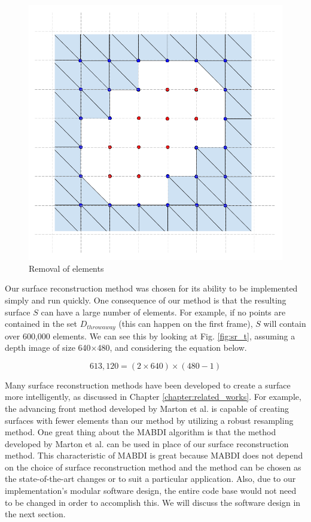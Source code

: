 \begin{figure}[h]%
\centering
  \includegraphics[width=.70\textwidth]
    {figures/diagram_sr_element_removal.png}
  \caption{Removal of elements}
  \label{fig:sr_em}
\end{figure}

Our surface reconstruction method was chosen for its ability to be implemented
simply and run quickly. One consequence of our method is that the resulting
surface $S$ can have a large number of elements. For example, if no points are
contained in the set $D_{throwaway}$ (this can happen on the first frame), $S$
will contain over 600,000 elements. We can see this by looking at Fig.
\ref{fig:sr_t}, assuming a depth image of size 640$\times$480, and considering
the equation below.

$$
613,120 = (2\times640)\times(480-1)
$$

Many surface reconstruction methods have been developed to create a surface more
intelligently, as discussed in Chapter \ref{chapter:related_works}. For example,
the advancing front method developed by Marton et al. \cite{Marton2009} is
capable of creating surfaces with fewer elements than our method by utilizing a
robust resampling method. One great thing about the MABDI algorithm is that the
method developed by Marton et al. can be used in place of our surface
reconstruction method. This characteristic of MABDI is great because MABDI does
not depend on the choice of surface reconstruction method and the method can be
chosen as the state-of-the-art changes or to suit a particular application.
Also, due to our implementation's modular software design, the entire code base
would not need to be changed in order to accomplish this. We will discuss the
software design in the next section.

